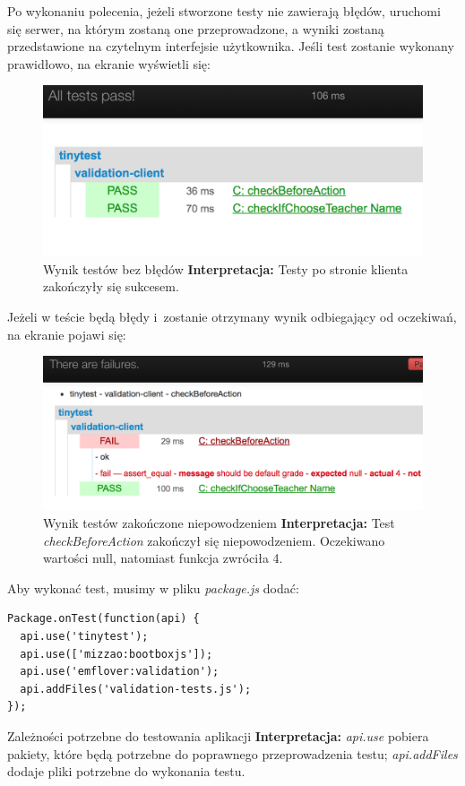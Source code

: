 \documentclass[openright]{xmgr}
\begin{document}
Po wykonaniu polecenia, jeżeli stworzone testy nie zawierają błędów, uruchomi się serwer, na którym zostaną one przeprowadzone, a wyniki zostaną przedstawione na czytelnym interfejsie użytkownika. Jeśli test zostanie wykonany prawidłowo, na ekranie wyświetli się:

\begin{figure}[H]
\centering
\includegraphics[width=0.7\hsize]{images/tinytestSucced}
\caption{Wynik testów bez błędów\label{RYS.20} \newline \newline \hspace{\linewidth} \textbf{Interpretacja:} Testy po stronie klienta zakończyły się sukcesem.}
\end{figure}

Jeżeli w teście będą błędy i~zostanie otrzymany wynik odbiegający od oczekiwań, na ekranie pojawi się:
\begin{figure}[H]
\centering
\includegraphics[width=0.7\hsize]{images/tinytestFailure}
\caption{Wynik testów zakończone niepowodzeniem\label{RYS.21} \newline \newline \hspace{\linewidth} \textbf{Interpretacja:} Test \textit{checkBeforeAction} zakończył się niepowodzeniem. Oczekiwano wartości null, natomiast funkcja zwróciła 4.}
\end{figure}

Aby wykonać test, musimy w pliku \textit{package.js} dodać:

\begin{listing}[H]
\begin{verbatim}
Package.onTest(function(api) {
  api.use('tinytest');
  api.use(['mizzao:bootboxjs']);
  api.use('emflover:validation');
  api.addFiles('validation-tests.js');
});
\end{verbatim}
\caption{Zależności potrzebne do testowania aplikacji \newline \newline \hspace{\linewidth} \textbf{Interpretacja:} \textit{api.use} pobiera pakiety, które będą potrzebne do poprawnego przeprowadzenia testu; \textit{api.addFiles} dodaje pliki potrzebne do wykonania testu. \newline}
\end{listing}
\end{document}
